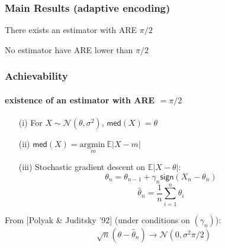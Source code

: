 \documentclass[mathserif]{beamer}
\newcommand{\sgn}{\mathsf{sign}}
\begin{document}
\begin{frame}
\frametitle{Main Results (adaptive encoding)}

\begin{theorem}[achievability]
There exists an estimator with ARE $\pi/2$
\end{theorem}

\begin{theorem}[converse]
No estimator have ARE lower than $\pi/2$
\end{theorem}

\end{frame}


\begin{frame}
\frametitle{Achievability}
\framesubtitle{existence of an estimator with ARE $= \pi/2$}

\begin{itemize}
\item[(i)] For $X \sim \mathcal{N}(\theta,\sigma^2)$, $\mathsf{med}(X) = \theta$ 
\pause
\item[(ii)] $\mathsf{med}(X) = \underset{m}{ \mathrm{argmin~}} \mathbb E \left|X-m \right|$
\pause
\item[(iii)] Stochastic gradient descent on $\mathbb E \left| X-\theta \right|$:
\[
\theta_n = \theta_{n-1} + \gamma_n \sgn(X_n - \theta_n)
\]
\[
\widehat{\theta}_n = \frac{1}{n} \sum_{i=1}^n \theta_i 
\]
\end{itemize}
\bigskip
\pause
From [Polyak \& Juditsky '92] (under conditions on $(\gamma_n)$): 
\[
\sqrt{n}(\theta- \widehat{\theta}_n) \rightarrow \mathcal N\left(0, \sigma^2 \pi /2 \right)
\]
\end{frame}

%
%
%
\end{document}
